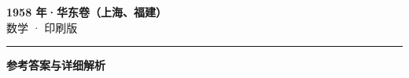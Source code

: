 \documentclass[zihao=5, a4paper]{ctexart}
\begin{document}
\begin{center}
  {\Large\bfseries 1958 年·华东卷（上海、福建）}\\[4pt]
  {\large 数学 · 印刷版}
\end{center}
\medskip
{}

\par\bigskip\hrule\bigskip
{}
\begin{center}{\large\bfseries 参考答案与详细解析}\end{center}
\smallskip

\end{document}
